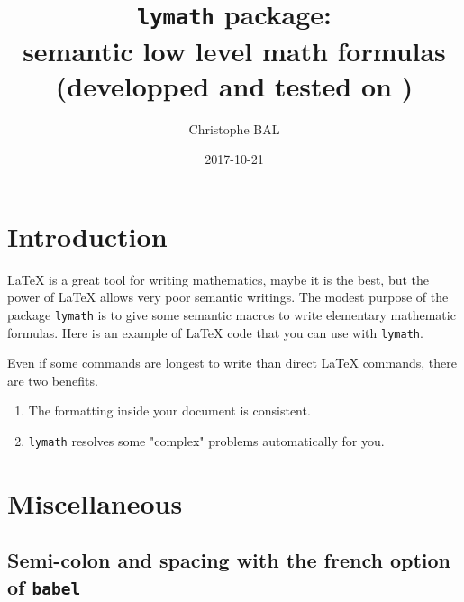 \documentclass[12pt,a4paper]{article}
\theoremstyle{definition}
\begin{document}
\title{\texttt{lymath} package:\\semantic low level math formulas\\{\footnotesize (developped and tested on \macosxname{})}}
\author{Christophe BAL}
\date{2017-10-21}

\maketitle


\section{Introduction}



\LaTeX{} is a great tool for writing mathematics, maybe it is the best, but the power of \LaTeX{} allows very poor semantic writings.
The modest purpose of the package \verb+lymath+ is to give some semantic macros to write elementary mathematic formulas.
Here is an example of \LaTeX{} code that you can use with \verb+lymath+.

\begin{tcblisting}{listing only}

Knowing that $\frac{df}{dx}(x) = 4 cos(x^2)$ on $[a ; b]$, we have: 
$\int_a^b cos(x^2) dx = \left[ \frac{1){4} f(x) \right]_a^b$.


Knowing that $\derfrac{f}{x}(x) = 4 cos(x^2)$ on $\intervalC{a}{b}$, we have: 
$\int_a^b cos(x^2) \dd{x} = \hook{\frac{1){4} f(x)}{a}{b}$.
\end{tcblisting}

Even if some commands are longest to write than direct \LaTeX{} commands, there are two benefits.
\begin{enumerate}
	\item The formatting inside your document is consistent.

	\item \verb+lymath+ resolves some "complex" problems automatically for you.
\end{enumerate}


\section{Miscellaneous}



\subsection{Semi-colon and spacing with the french option of \texttt{babel}}
\end{document}
